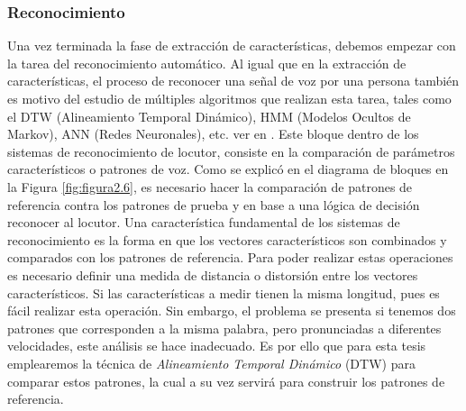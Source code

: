 \subsubsection{Reconocimiento}
Una vez terminada la fase de extracción de características, debemos empezar con la tarea del reconocimiento automático. Al igual que en la extracción de características, el proceso de reconocer una señal de voz por una persona también es motivo del estudio de múltiples algoritmos que realizan esta tarea, tales como el DTW (Alineamiento Temporal Dinámico), HMM (Modelos Ocultos de Markov), ANN (Redes Neuronales), etc. ver en \citep{luna}. 
\vskip 0.5cm
Este bloque dentro de los sistemas de reconocimiento de locutor, consiste en la comparación de parámetros característicos o patrones de voz. Como se explicó en el diagrama de bloques en la Figura \ref{fig:figura2.6}, es necesario hacer la comparación de patrones de referencia contra los patrones de prueba y en base a una lógica de decisión reconocer al locutor.
\vskip 0.5cm
Una característica fundamental de los sistemas de reconocimiento es la forma en que los vectores característicos son combinados y comparados con los patrones de referencia. Para poder realizar estas operaciones es necesario definir una medida de distancia o distorsión entre los vectores característicos. Si las características a medir tienen la misma longitud, pues es fácil realizar esta operación. Sin embargo, el problema se presenta si tenemos dos patrones que corresponden a la misma palabra, pero pronunciadas a diferentes velocidades, este análisis se hace inadecuado. Es por ello que para esta tesis emplearemos la técnica de \textit{Alineamiento Temporal Dinámico} (DTW) para comparar estos patrones, la cual a su vez servirá para construir los patrones de referencia.
\newpage
